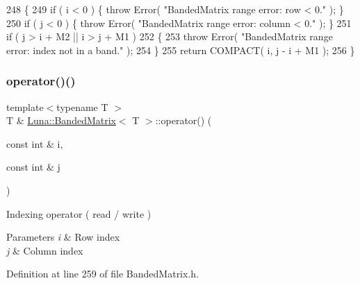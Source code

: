 \begin{DoxyCode}
248   \{
249     \textcolor{keywordflow}{if} ( i < 0 )    \{ \textcolor{keywordflow}{throw} Error( \textcolor{stringliteral}{"BandedMatrix range error: row < 0."} ); \}
250     \textcolor{keywordflow}{if} ( j < 0 )    \{ \textcolor{keywordflow}{throw} Error( \textcolor{stringliteral}{"BandedMatrix range error: column < 0."} ); \}
251     \textcolor{keywordflow}{if} ( j > i + M2 || i > j + M1 )
252     \{
253       \textcolor{keywordflow}{throw} Error( \textcolor{stringliteral}{"BandedMatrix range error: index not in a band."} );
254     \}
255     \textcolor{keywordflow}{return} COMPACT( i, j - i + M1 );
256   \}
\end{DoxyCode}
\mbox{\label{classLuna_1_1BandedMatrix_a0a04982508fd1af82063900788f179de}} 
\subsubsection{\texorpdfstring{operator()()}{operator()()}\hspace{0.1cm}{\footnotesize\ttfamily [2/2]}}
{\footnotesize\ttfamily template$<$typename T $>$ \\
T \& \hyperlink{classLuna_1_1BandedMatrix}{Luna\+::\+Banded\+Matrix}$<$ T $>$\+::operator() (\begin{DoxyParamCaption}\item[{const int \&}]{i,  }\item[{const int \&}]{j }\end{DoxyParamCaption})\hspace{0.3cm}{\ttfamily [inline]}}



Indexing operator ( read / write ) 


\begin{DoxyParams}{Parameters}
{\em i} & Row index \\
\hline
{\em j} & Column index \\
\hline
\end{DoxyParams}


Definition at line 259 of file Banded\+Matrix.\+h.



